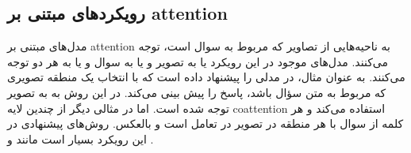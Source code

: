 { 	\subsection{رویکردهای مبتنی بر attention}
	{
		 مدل‌های مبتنی بر attention به ناحیه‌هایی از تصاویر که مربوط به سوال است، توجه می‌کنند. مدل‌های موجود در این رویکرد یا به تصویر و یا به سوال و یا به هر دو توجه می‌کنند. به عنوان مثال، در
		 \cite{shih2016look}
		 مدلی را پیشنهاد داده است که با انتخاب یک منطقه تصویری که مربوط به متن سؤال باشد، پاسخ را پیش بینی می‌کند.  در این روش به به تصویر توجه شده است. اما در مثالی دیگر  
		 \cite{nguyen2018improved}
		 از چندین لایه coattention استفاده می‌کند و هر کلمه از سوال با هر منطقه در تصویر در تعامل است و بالعکس. روش‌های پیشنهادی در این رویکرد بسیار است مانند 
		 \cite{kim2018bilinear}
		  و 
		 \cite{shi2018question} .
	}
																																																						
}